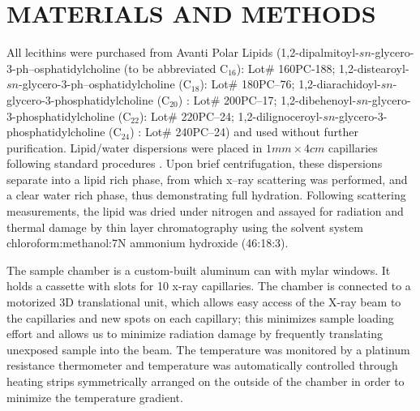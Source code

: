 \section{MATERIALS AND METHODS}


All lecithins were purchased from Avanti Polar Lipids (1,2-dipalmitoyl-$sn$-glycero-3-ph--osphatidylcholine (to be abbreviated C$_{16}$): Lot\# 
160PC-188; 1,2-distearoyl-$sn$-glycero-3-ph--osphatidylcholine (C$_{18}$): 
Lot\# 180PC--76; 1,2-diarachidoyl-$sn$-glycero-3-phosphatidylcholine (C$_{20}$)
: Lot\# 200PC--17; 1,2-dibehenoyl-$sn$-glycero-3-phosphatidylcholine (C$_{22}$):
Lot\# 220PC--24; 1,2-dilignoceroyl-$sn$-glycero-3-phosphatidylcholine (C$_{24}$)
: Lot\# 240PC--24) and used 
without further purification.
Lipid/water dispersions were placed in
$1mm \times 4cm$ capillaries following standard procedures \cite{STN92}. 
Upon brief centrifugation, these dispersions separate
into a lipid rich phase, from which x--ray scattering was performed, and a clear
water rich phase, thus demonstrating full hydration. Following scattering 
measurements, the lipid was dried under nitrogen
and assayed for radiation and thermal damage by thin layer chromatography 
using the solvent system chloroform:methanol:7N ammonium hydroxide (46:18:3).


The sample chamber is a custom-built aluminum can with mylar windows.  It
holds a cassette with slots for 10 x-ray capillaries. The chamber is connected
to a motorized 3D translational unit, which allows easy access of the X-ray
beam to the capillaries and new spots on each capillary; this minimizes sample 
loading effort and allows us to minimize radiation damage by frequently translating
unexposed sample into the beam. The temperature was monitored by a platinum
resistance thermometer and temperature was automatically controlled through
heating strips symmetrically arranged on the outside of the chamber in order
to minimize the temperature gradient.

